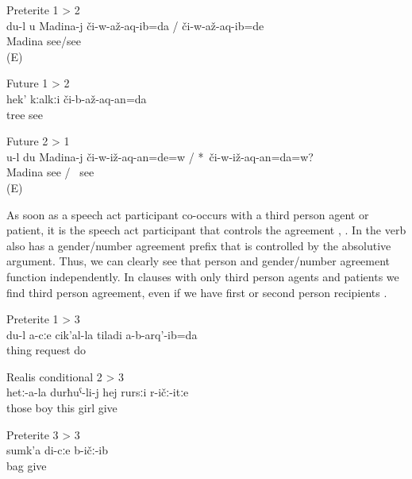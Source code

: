 %
\begin{exe}
		\ex	Preterite 1 > 2\\	\label{ex:‎‎‎I showed you to Madina PT12}
		\gll	du-l	u	Madina-j	či-w-až-aq-ib=da	/	či-w-až-aq-ib=de\\
					Madina	see\slash{}see \\
		\glt	{} (E)

		\ex	Future 1 > 2\\	\label{ex:(I) will show (you) the tree FT12}
		\gll	hek'	kːalkːi	či-b-až-aq-an=da\\
				tree	see\\
		\glt	{}

		\ex	Future 2 > 1\\	\label{ex:‎Will you show me to Madina FT21}
		\gll	u-l	du	Madina-j	či-w-iž-aq-an=de=w /	 {*}~či-w-iž-aq-an=da=w?\\
					Madina	see	/	{\hphantom{*}}~see\\
		\glt	{} (E)
\end{exe}

As soon as a speech act participant co-occurs with a third person agent or patient, it is the speech act participant that controls the agreement , . In  the verb also has a gender/number agreement prefix that is controlled by the absolutive argument. Thus, we can clearly see that person and gender/number agreement function independently. In clauses with only third person agents and patients we find third person agreement, even if we have first or second person recipients .
%
\begin{exe}
		\ex	Preterite 1 > 3\\		\label{ex:I did not ask you anything PT13}
		\gll	du-l	a-cːe	cik'al-la	tiladi	a-b-arq'-ib=da\\
					thing	request	do\\
		\glt	{}

		\ex	Realis conditional 2 > 3\\	\label{ex:‎‎if you give the girl to their son RC23}
		\gll	hetː-a-la	durħuˁ-li-j	hej	rursːi	r-ičː-itːe\\
			those	boy	this	girl	give\\
		\glt	{}

		\ex	Preterite 3 > 3\\		\label{ex:(He) gave me his bag PT33}
		\gll	sumk'a	di-cːe	b-ičː-ib\\
			bag		give\\
		\glt	{}
\end{exe}
%


